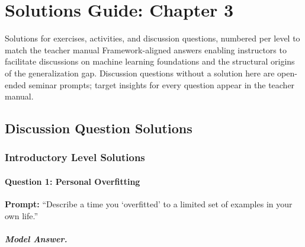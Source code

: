 
\chapter{Solutions Guide: Chapter 3}
\label{ch:solutions-ch03}

\begin{chapterquote}{Solutions for exercises, activities, and discussion questions, numbered per level to match the teacher manual}
Framework-aligned answers enabling instructors to facilitate discussions on machine learning foundations and the structural origins of the generalization gap. Discussion questions without a solution here are open-ended seminar prompts; target insights for every question appear in the teacher manual.
\end{chapterquote}

\section{Discussion Question Solutions}

\subsection{Introductory Level Solutions}

\subsubsection{Question 1: Personal Overfitting}

\textbf{Prompt:} ``Describe a time you `overfitted' to a limited set of examples in your own life.''

\paragraph{Model Answer.}

